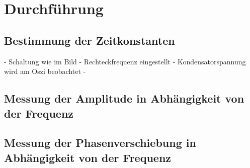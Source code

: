 \section{Durchführung}
\subsection{Bestimmung der Zeitkonstanten}
- Schaltung wie im Bild
- Rechteckfrequenz eingestellt
- Kondensatorspannung wird am Oszi beobachtet
-

\subsection{Messung der Amplitude in Abhängigkeit von der Frequenz}

\subsection{Messung der Phasenverschiebung in Abhängigkeit von der Frequenz}